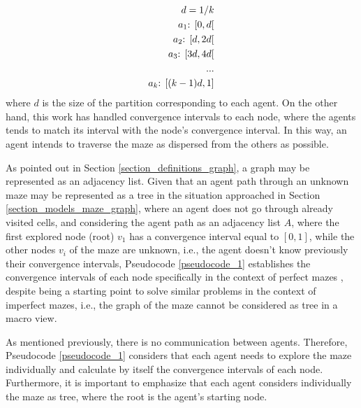 \begin{equation}
	\begin{align}
			d = 1/k\\
		a_{1} \textnormal{: } [0, d[\\
		a_{2} \textnormal{: } [d, 2d[\\
		a_{3} \textnormal{: } [3d, 4d[\\
		...\\
		a_{k} \textnormal{: } [(k-1)d, 1]
	\end{align}
\end{equation}
where $d$ is the size of the partition corresponding to each agent. On the other hand, this work has handled convergence intervals to each node, where the agents tends to match its interval with the node's convergence interval. In this way, an agent intends to traverse the maze as dispersed from the others as possible.

As pointed out in Section \ref{section_definitions_graph}, a graph may be represented as an adjacency list. Given that an agent path through an unknown maze may be represented as a tree in the situation approached in Section \ref{section_models_maze_graph}, where an agent does not go through already visited cells, and considering the agent path as an adjacency list $A$, where the first explored node (root) $v_{1}$ has a convergence interval equal to $[0,1]$, while the other nodes $v_{i}$ of the maze are unknown, i.e., the agent doesn't know previously their convergence intervals, Pseudocode \ref{pseudocode_1} establishes the convergence intervals of each node specifically in the context of perfect mazes \cite{Muhammad2021}, despite being a starting point to solve similar problems in the context of imperfect mazes, i.e., the graph of the maze cannot be considered as tree in a macro view.

As mentioned previously, there is no communication between agents. Therefore, Pseudocode \ref{pseudocode_1} considers that each agent needs to explore the maze individually and calculate by itself the convergence intervals of each node. Furthermore, it is important to emphasize that each agent considers individually the maze as tree, where the root is the agent's starting node.

